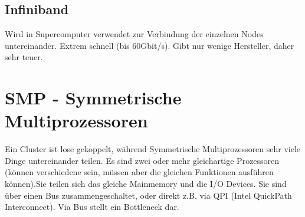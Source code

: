 \subsection{Infiniband}
Wird in Supercomputer verwendet zur Verbindung der einzelnen Nodes untereinander. Extrem schnell (bis 60Gbit/s). Gibt nur wenige Hersteller, daher sehr teuer.
\section{SMP - Symmetrische Multiprozessoren}
Ein Cluster ist lose gekoppelt, während Symmetrische Multiprozessoren sehr viele Dinge untereinander teilen. Es sind zwei oder mehr gleichartige Prozessoren (können verschiedene sein, müssen aber die gleichen Funktionen ausführen können).Sie teilen sich das gleiche Mainmemory und die I/O Devices. Sie sind über einen Bus zusammengeschaltet, oder direkt z.B. via QPI (Intel QuickPath Interconnect). Via Bus stellt ein Bottleneck dar.
